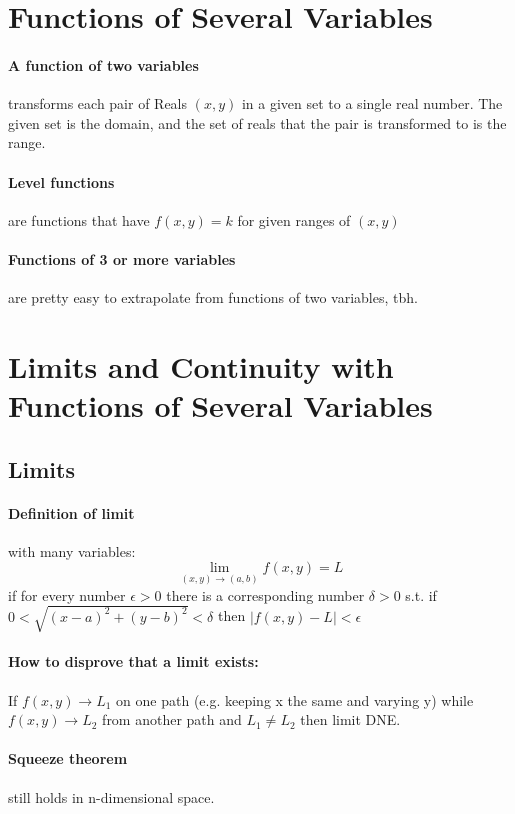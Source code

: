\documentclass[a4paper,12pt]{report}
\begin{document}
\section{Functions of Several Variables}
\paragraph{A function of two variables } transforms each pair of Reals $(x, y)$ in a given set to a single real number. The given set is the domain, and the set of reals that the pair is transformed to is the range.

\paragraph{Level functions } are functions that have $f(x, y) = k$ for given ranges of $(x, y)$

\paragraph{Functions of 3 or more variables } are pretty easy to extrapolate from functions of two variables, tbh.

\section{Limits and Continuity with Functions of Several Variables}
\subsection{Limits}
\paragraph{Definition of limit } with many variables:
$$\lim_{(x, y) \to (a, b)} f(x, y) = L$$
if for every number $\epsilon > 0$ there is a corresponding number $\delta > 0$ s.t.
if $0 < \sqrt{(x-a)^2 + (y-b)^2} < \delta$ then $|f(x, y) - L | < \epsilon$

\paragraph{How to disprove that a limit exists: }

If $f(x, y) \to L_1$ on one path (e.g. keeping x the same and varying y) while $f(x, y) \to L_2$ from another path and $L_1 \neq L_2$ then limit DNE.

\paragraph{Squeeze theorem } still holds in n-dimensional space. 
\end{document}
